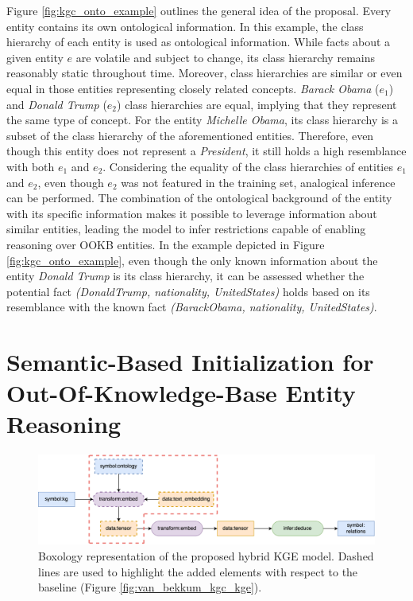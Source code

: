 Figure \ref{fig:kgc_onto_example} outlines the general idea of the proposal. Every entity contains its own ontological information. In this example, the class hierarchy of each entity is used as ontological information. While facts about a given entity $e$ are volatile and subject to change, its class hierarchy remains reasonably static throughout time. Moreover, class hierarchies are similar or even equal in those entities representing closely related concepts. \textit{Barack Obama} ($e_1$) and \textit{Donald Trump} ($e_2$) class hierarchies are equal, implying that they represent the same type of concept. For the entity \textit{Michelle Obama}, its class hierarchy is a subset of the class hierarchy of the aforementioned entities. Therefore, even though this entity does not represent a \textit{President}, it still holds a high resemblance with both $e_1$ and $e_2$. Considering the equality of the class hierarchies of entities $e_1$ and $e_2$, even though $e_2$ was not featured in the training set, analogical inference can be performed. The combination of the ontological background of the entity with its specific information makes it possible to leverage information about similar entities, leading the model to infer restrictions capable of enabling reasoning over OOKB entities. In the example depicted in Figure \ref{fig:kgc_onto_example}, even though the only known information about the entity \textit{Donald Trump} is its class hierarchy, it can be assessed whether the potential fact \textit{(DonaldTrump, nationality, UnitedStates)} holds based on its resemblance with the known fact \textit{(BarackObama, nationality, UnitedStates)}. 

\color{purple}

\section{Semantic-Based Initialization for Out-Of-Knowledge-Base Entity Reasoning}

\label{4_sec:semantic_initialization}
\begin{figure}
    \centering
    \includegraphics[width=\linewidth]{4_kbsintegrationdl/figures/VanBekkum_KGEOnto.eps}
    \caption{Boxology representation of the proposed hybrid KGE model. Dashed lines are used to highlight the added elements with respect to the baseline (Figure \ref{fig:van_bekkum_kgc_kge}).}
    \label{fig:box_krintodl}
\end{figure} 

